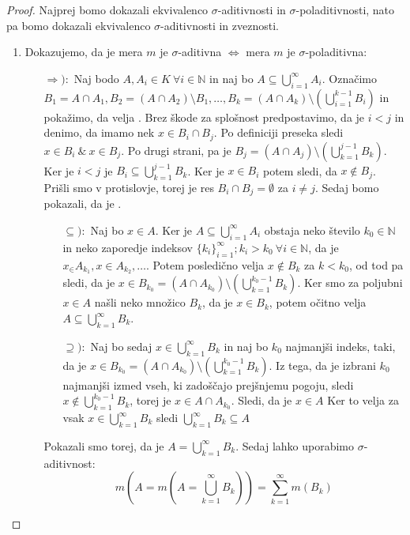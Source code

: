 \documentclass[a4paper, 10pt]{article}
\newcommand{\mth}[1]{\ensuremath{\mathbb{#1}}}
\newcommand{\N}{\mth{N}}
\begin{document}
		\begin{proof}
			Najprej bomo dokazali ekvivalenco $\sigma$-aditivnosti in $\sigma$-poladitivnosti, nato pa bomo dokazali ekvivalenco $\sigma$-aditivnosti in zveznosti.
			\begin{enumerate}
				\item Dokazujemo, da je mera $m$ je $\sigma$-aditivna $\iff$ mera $m$ je $\sigma$-poladitivna:\begin{itemize}
					\item[$\Rightarrow):$] Naj bodo $A, A_i \in K~\forall i\in \N$ in naj bo $A\subseteq \bigcup_{i = 1}^\infty A_i$. Označimo $B_1 = A\cap A_1, B_2 = (A\cap A_2)\setminus B_1, \ldots, B_k = (A\cap A_k)\setminus (\bigcup_{i = 1}^{k-1}B_i)$ in pokažimo, da velja . Brez škode za splošnost predpostavimo, da je $i<j$ in denimo, da imamo nek $x\in B_i\cap B_j$. Po definiciji preseka sledi $x\in B_i~\&~ x\in B_j$. Po drugi strani, pa je $B_j = (A\cap A_j)\setminus (\bigcup_{k = 1}^{j-1}B_k)$. Ker je $i<j$ je $B_i \subseteq \bigcup_{k = 1}^{j-1}B_k$. Ker je $x\in B_i$ potem sledi, da $x\notin B_j$. Prišli smo v protislovje, torej je res $B_i\cap B_j = \emptyset$ za $i\neq j$.
					Sedaj bomo pokazali, da je . \begin{itemize}
						\item[$\subseteq):$] Naj bo $x\in A$. Ker je $A \subseteq \bigcup_{i = 1}^\infty A_i$ obstaja neko število $k_0 \in \N$ in neko zaporedje indeksov $\{k_i\}_{i = 1}^\infty; k_i > k_0 ~\forall i\in\N$, da je $x_\in A_{k_1}, x\in A_{k_2}, \ldots $. Potem posledično velja $x\notin B_k$ za $k< k_0$, od tod pa sledi, da je $x\in B_{k_0} = (A\cap A_{k_0})\setminus (\bigcup_{k = 1}^{k_0 - 1}B_k)$. Ker smo za poljubni $x\in A$ našli neko množico $B_k$, da je $x\in B_k$, potem očitno velja $A\subseteq \bigcup_{k = 1}^\infty B_k$.
						\item[$\supseteq):$] Naj bo sedaj $x\in \bigcup_{k = 1}^\infty B_k$ in naj bo $k_0$ najmanjši indeks, taki, da je $x\in B_{k_0} = (A\cap A_{k_0})\setminus (\bigcup_{k = 1}^{k_0 -1} B_k)$. Iz tega, da je izbrani $k_0$ najmanjši izmed vseh, ki zadoščajo prejšnjemu pogoju, sledi $x\notin \bigcup_{k = 1}^{k_0 -1} B_k$, torej je $x\in A\cap A_{k_0}$. Sledi, da je $x\in A$ Ker to velja za vsak $x\in \bigcup_{k = 1}^\infty B_k$ sledi $\bigcup_{k = 1}^\infty B_k \subseteq A$
					\end{itemize}
					Pokazali smo torej, da je $A = \bigcup_{k = 1}^\infty B_k$. Sedaj lahko uporabimo $\sigma$-aditivnost: \[m(A = m(A = \bigcup_{k = 1}^\infty B_k)) = \sum_{k = 1}^\infty m(B_k)\]

\end{itemize}
\end{enumerate}
\end{proof}
\end{document}
